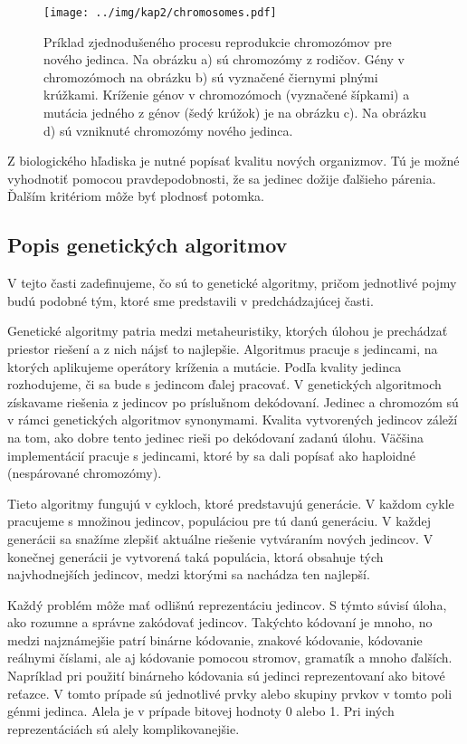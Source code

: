 \begin{figure}[h]
\centering
\centerline{\mbox{\texttt{[image: ../img/kap2/chromosomes.pdf]}}}
\caption{Príklad zjednodušeného procesu reprodukcie chromozómov pre nového jedinca. Na obrázku a) sú chromozómy z rodičov. Gény v chromozómoch na obrázku b) sú vyznačené čiernymi plnými krúžkami. Kríženie génov v chromozómoch (vyznačené šípkami) a mutácia jedného z génov (šedý krúžok) je na obrázku c). Na obrázku d) sú vzniknuté chromozómy nového jedinca.}\label{fig:Chromosomes}
\end{figure}

Z biologického hľadiska je nutné popísať kvalitu nových organizmov. Tú je možné vyhodnotiť pomocou pravdepodobnosti, že sa jedinec dožije ďalšieho párenia. Ďalším kritériom môže byť plodnosť potomka.

\subsection{Popis genetických algoritmov}\label{kap2:2.1:2.1.2:AboutGeneticAlgo}
V tejto časti zadefinujeme, čo sú to genetické algoritmy, pričom jednotlivé pojmy budú podobné tým, ktoré sme predstavili v predchádzajúcej časti. 

Genetické algoritmy patria medzi metaheuristiky, ktorých úlohou je prechádzať priestor riešení a z nich nájsť to najlepšie. Algoritmus pracuje s jedincami, na ktorých aplikujeme operátory kríženia a mutácie. Podľa kvality jedinca rozhodujeme, či sa bude s jedincom ďalej pracovať. V genetických algoritmoch získavame riešenia z jedincov po príslušnom dekódovaní. Jedinec a chromozóm sú v rámci genetických algoritmov synonymami. Kvalita vytvorených jedincov záleží na tom, ako dobre tento jedinec rieši po dekódovaní zadanú úlohu. Väčšina implementácií pracuje s jedincami, ktoré by sa dali popísať ako haploidné (nespárované chromozómy).

Tieto algoritmy fungujú v cykloch, ktoré predstavujú generácie. V každom cykle pracujeme s množinou jedincov, populáciou pre tú danú generáciu. V každej generácii sa snažíme zlepšiť aktuálne riešenie vytváraním nových jedincov. V konečnej generácii je vytvorená taká populácia, ktorá obsahuje tých najvhodnejších jedincov, medzi ktorými sa nachádza ten najlepší.

Každý problém môže mať odlišnú reprezentáciu jedincov. S týmto súvisí úloha, ako rozumne a správne zakódovať jedincov. Takýchto kódovaní je mnoho, no medzi najznámejšie patrí binárne kódovanie, znakové kódovanie, kódovanie reálnymi číslami, ale aj kódovanie pomocou stromov, gramatík a mnoho ďalších. Napríklad pri použití binárneho kódovania sú jedinci reprezentovaní ako bitové reťazce. V tomto prípade sú jednotlivé prvky alebo skupiny prvkov v tomto poli génmi jedinca. Alela je v prípade bitovej hodnoty 0 alebo 1. Pri iných reprezentáciách sú alely komplikovanejšie.

